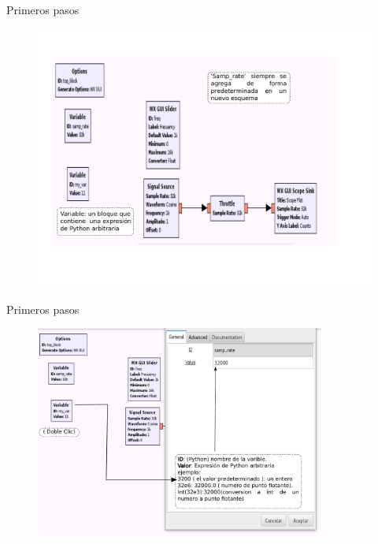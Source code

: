 \begin{frame}{Primeros pasos}
\begin{figure}[H]
\vspace{-1cm}
\centering
\includegraphics[width=\textwidth]{lab1/pdf/lab1_8.pdf}
\end{figure}
\end{frame}

\begin{frame}{Primeros pasos}
\begin{figure}[H]
\vspace{-3mm}
\centering
\includegraphics[width=0.85\textwidth]{lab1/pdf/lab1_9.pdf}
\end{figure}
\end{frame}


